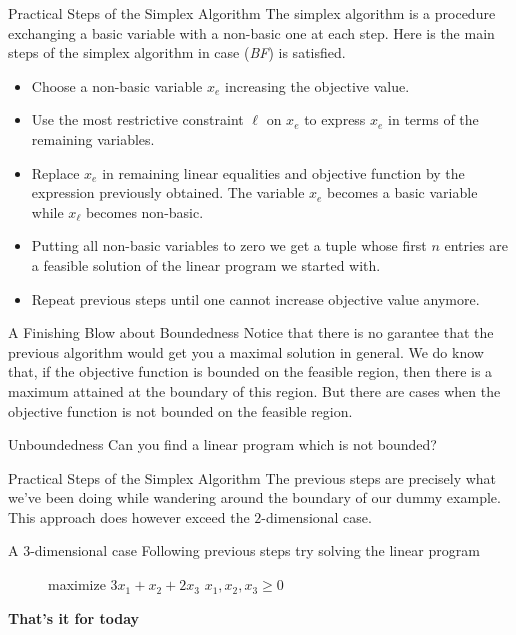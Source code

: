 \documentclass[aspectratio = 169]{beamer}
\begin{document}
\begin{frame}{Practical Steps of the Simplex Algorithm}
  The simplex algorithm is a procedure exchanging a basic variable
  with a non-basic one at each step. \pause Here is the main steps of
  the simplex algorithm in case (\emph{BF}) is satisfied.
  \begin{itemize}
  \item<2->[\textbullet]
    Choose a non-basic variable $x_e$ increasing the objective
    value.
  \item<3->[\textbullet]
    Use the most restrictive constraint $\ell$ on $x_e$ to
    express $x_e$ in terms of the remaining variables.
  \item<4->[\textbullet]
    Replace $x_e$ in remaining linear equalities and objective
    function by the expression previously obtained. The variable $x_e$
    becomes a basic variable while $x_\ell$ becomes non-basic.
  \item<5->[\textbullet]
    Putting all non-basic variables to zero we get a tuple whose
    first $n$ entries are a feasible solution of the linear
    program we started with.
  \item<6->[\textbullet]
    Repeat previous steps until one cannot increase objective
    value anymore.
  \end{itemize}
\end{frame}

\begin{frame}{A Finishing Blow about Boundedness}
  Notice that there is no garantee that the previous algorithm would
  get you a maximal solution in general. We do know that, if the
  objective function is bounded on the feasible region, then there is
  a maximum attained at the boundary of this region. But there are
  cases when the objective function is not bounded on the feasible
  region.
  \begin{halfshyblock}{Unboundedness}
    Can you find a linear program which is not bounded?
  \end{halfshyblock}
\end{frame}

\begin{frame}{Practical Steps of the Simplex Algorithm}
  The previous steps are precisely what we've been doing while
  wandering around the boundary of our dummy example. This approach
  does however exceed the $2$-dimensional case.
  \begin{halfshyblock}{A $3$-dimensional case}
    Following previous steps try solving the linear program
    \begin{figure}
      \begin{linearProg}{
          maximize
        }{
          $3x_1 + x_2 + 2x_3 $
        }{
        }{
          $x_1, x_2, x_3 \geq 0 $
        }
      \end{linearProg}
    \end{figure}
  \end{halfshyblock}
\end{frame}

\begin{frame}
  \begin{center}
    {\huge \textbf{That's it for today}}
  \end{center}
\end{frame}



\end{document}
